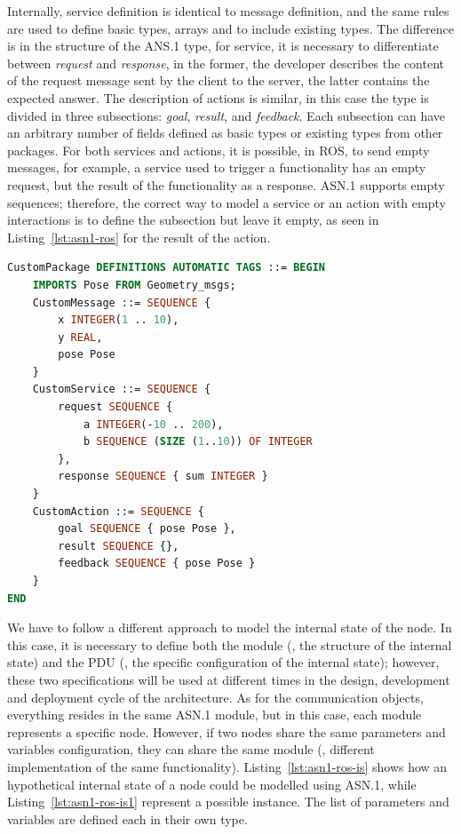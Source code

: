 Internally, service definition is identical to message definition, and the same rules are used to define basic types, arrays and to include existing types. The difference is in the structure of the ANS.1 type, for service, it is necessary to differentiate between \textit{request} and \textit{response}, in the former, the developer describes the content of the request message sent by the client to the server, the latter contains the expected answer. The description of actions is similar, in this case the type is divided in three subsections: \textit{goal}, \textit{result}, and \textit{feedback}. Each subsection can have an arbitrary number of fields defined as basic types or existing types from other packages. For both services and actions, it is possible, in ROS, to send empty messages, for example, a service used to trigger a functionality has an empty request, but the result of the functionality as a response. ASN.1 supports empty sequences; therefore, the correct way to model a service or an action with empty interactions is to define the subsection but leave it empty, as seen in Listing~\ref{lst:asn1-ros} for the result of the action.

\begin{lstlisting}[language=ASN1,caption={ROS message, service and action definition using ASN.1.},label=lst:asn1-ros]
CustomPackage DEFINITIONS AUTOMATIC TAGS ::= BEGIN
	IMPORTS Pose FROM Geometry_msgs;
	CustomMessage ::= SEQUENCE {
		x INTEGER(1 .. 10),
		y REAL,
		pose Pose
	}
	CustomService ::= SEQUENCE {
		request SEQUENCE {
			a INTEGER(-10 .. 200),
			b SEQUENCE (SIZE (1..10)) OF INTEGER
		},
		response SEQUENCE { sum INTEGER }
	}
	CustomAction ::= SEQUENCE {
		goal SEQUENCE { pose Pose },
		result SEQUENCE {},
		feedback SEQUENCE { pose Pose }
	}
END
\end{lstlisting}

\bigskip

We have to follow a different approach to model the internal state of the node. In this case, it is necessary to define both the module (\ie, the structure of the internal state) and the PDU (\ie, the specific configuration of the internal state); however, these two specifications will be used at different times in the design, development and deployment cycle of the architecture. As for the communication objects, everything resides in the same ASN.1 module, but in this case, each module represents a specific node. However, if two nodes share the same parameters and variables configuration, they can share the same module (\eg, different implementation of the same functionality). Listing~\ref{lst:asn1-ros-is} shows how an hypothetical internal state of a node could be modelled using ASN.1, while Listing~\ref{lst:asn1-ros-is1} represent a possible instance. The list of parameters and variables are defined each in their own type.

